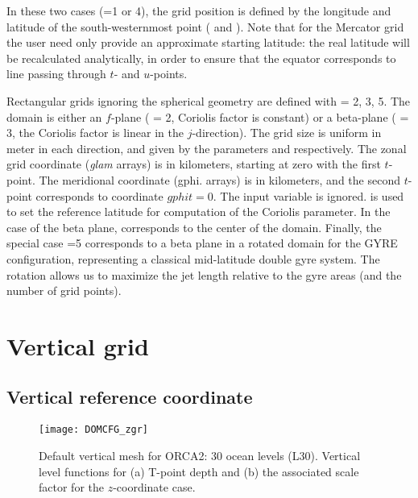 \documentclass[../main/NEMO_manual]{subfiles}
\begin{document}
In these two cases (=1 or 4), the grid position is defined by the
longitude and latitude of the south-westernmost point (
and ). Note that for the Mercator grid the user need only provide
an approximate starting latitude: the real latitude will be recalculated analytically,
in order to ensure that the equator corresponds to line passing through $t$-
and $u$-points.

Rectangular grids ignoring the spherical geometry are defined with
 = 2, 3, 5. The domain is either an $f$-plane ( = 2,
Coriolis factor is constant) or a beta-plane ( = 3, the Coriolis factor
is linear in the $j$-direction). The grid size is uniform in meter in each direction,
and given by the parameters  and  respectively.
The zonal grid coordinate (\textit{glam} arrays) is in kilometers, starting at zero
with the first $t$-point. The meridional coordinate (gphi. arrays) is in kilometers,
and the second $t$-point corresponds to coordinate $gphit=0$. The input
variable  is ignored.  is used to set the reference
latitude for computation of the Coriolis parameter. In the case of the beta plane,
 corresponds to the center of the domain. Finally, the special case
=5 corresponds to a beta plane in a rotated domain for the
GYRE configuration, representing a classical mid-latitude double gyre system.
The rotation allows us to maximize the jet length relative to the gyre areas
(and the number of grid points).

\section{Vertical grid}
\label{sec:DOMCFG_vert}

\subsection{Vertical reference coordinate}
\label{sec:DOMCFG_zref}

\begin{figure}[!tb]
  \centering
  \texttt{[image: DOMCFG\_zgr]}
  \caption[DOMAINcfg: default vertical mesh for ORCA2]{
    Default vertical mesh for ORCA2: 30 ocean levels (L30).
    Vertical level functions for (a) T-point depth and (b) the associated scale factor for
    the $z$-coordinate case.}
  \label{fig:DOMCFG_zgr}
\end{figure}
\end{document}
